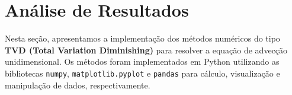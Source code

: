 \documentclass{article}
\begin{document}






















\section{Análise de Resultados}
Nesta seção, apresentamos a implementação dos métodos numéricos do tipo \textbf{TVD (Total Variation Diminishing)} para resolver a equação de advecção unidimensional. Os métodos foram implementados em Python utilizando as bibliotecas \texttt{numpy}, \texttt{matplotlib.pyplot} e \texttt{pandas} para cálculo, visualização e manipulação de dados, respectivamente.
\end{document}
